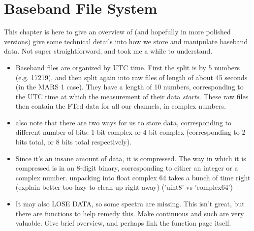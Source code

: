 \chapter{Baseband File System}
\label{chap: baseband}

This chapter is here to give an overview of (and hopefully in more polished versions) give some technical details
into how we store and manipulate baseband data. Not super straightforward, and took me a while to understand.

\begin{itemize}
\item Baseband files are organized by UTC time. 
First the split is by 5 numbers (e.g. 17219), and then split again into raw files of length of about 45 seconds (in the MARS 1 case). 
They have a length of 10 numbers, corresponding to the UTC time at which the measurement of their data \textit{starts}. 
These raw files then contain the FTed data for all our channels, in complex numbers.

\item also note that there are two ways for us to store data, corresponding to different number of bits: 1 bit complex or 4 bit complex 
(corresponding to 2 bits total, or 8 bits total respectively).

\item Since it's an insane amount of data, it is compressed. The way in which it is compressed is in an 8-digit binary, corresponding to either an integer or a complex number. 
unpacking into float complex 64 takes a bunch of time right (explain better too lazy to clean up right away) ('uint8' vs 'complex64')

\item It may also LOSE DATA, so some spectra are missing. This isn't great, but there are functions to help remedy this. 
Make continuous and such are very valuable. Give brief overview, and perhaps link the function page itself.

\end{itemize}